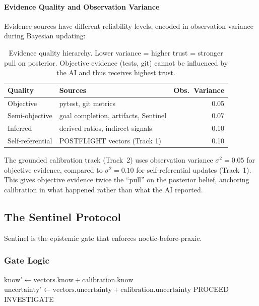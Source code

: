 \paragraph{Evidence Quality and Observation Variance}

Evidence sources have different reliability levels, encoded in observation variance during Bayesian updating:

\begin{table}[h]
\centering
\begin{tabular}{llr}
\toprule
\textbf{Quality} & \textbf{Sources} & \textbf{Obs.\ Variance} \\
\midrule
Objective & pytest, git metrics & 0.05 \\
Semi-objective & goal completion, artifacts, Sentinel & 0.07 \\
Inferred & derived ratios, indirect signals & 0.10 \\
Self-referential & POSTFLIGHT vectors (Track 1) & 0.10 \\
\bottomrule
\end{tabular}
\caption{Evidence quality hierarchy. Lower variance = higher trust = stronger pull on posterior. Objective evidence (tests, git) cannot be influenced by the AI and thus receives highest trust.}
\label{tab:evidence-quality}
\end{table}

The grounded calibration track (Track~2) uses observation variance $\sigma^2 = 0.05$ for objective evidence, compared to $\sigma^2 = 0.10$ for self-referential updates (Track~1). This gives objective evidence twice the ``pull'' on the posterior belief, anchoring calibration in what happened rather than what the AI reported.

\subsection{The Sentinel Protocol}

Sentinel is the epistemic gate that enforces noetic-before-praxic.

\subsubsection{Gate Logic}

\begin{algorithm}
\caption{Sentinel Decision}
\label{alg:sentinel}
\begin{algorithmic}[1]
    \State $\text{know}' \gets \text{vectors.know} + \text{calibration.know}$
    \State $\text{uncertainty}' \gets \text{vectors.uncertainty} + \text{calibration.uncertainty}$
        \State \Return PROCEED
    \Else
        \State \Return INVESTIGATE
    \EndIf
\EndProcedure
\end{algorithmic}
\end{algorithm}

